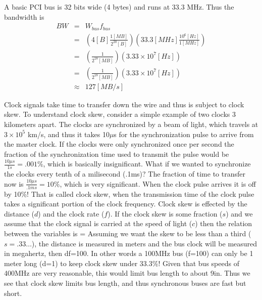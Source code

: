 \begin{example}[PCI]
A basic PCI bus is 32 bits wide (4 bytes) and runs at 33.3 MHz.  Thus the bandwidth is
\begin{eqnarray}
BW 
&=& W_{bus}f_{bus} \\
&=& \left(4 [B]\frac{1 [MB]}{2^{20} [B]}\right)\left(33.3 [MHz]\frac{10^6 [Hz]}{1 [MHz]}\right) \\
&=& \left(\frac{1}{2^{18} [MB]}\right)\left(3.33\times 10^7 [Hz]\right) \\
&=& \left(\frac{1}{2^{18} [MB]}\right)\left(3.33\times 10^7 [Hz]\right) \\
&\approx & 127 [MB/s]
\end{eqnarray}
\end{example}



Clock signals take time to transfer down the wire and thus is subject to clock skew.  To understand clock skew, consider a simple example of two clocks 3 kilometers apart.  The clocks are synchronized by a beam of light, which travels at $3\times 10^5$ km/s, and thus it takes 10$\mu$s for the synchronization pulse to arrive from the master clock.  If the clocks were only synchronized once per second the fraction of the synchronization time used to transmit the pulse would be $\frac{10\mu s}{1s}=.001\%$, which is basically insignificant. What if we wanted to synchronize the clocks every tenth of a milisecond (.1ms)? The fraction of time to transfer now is $\frac{10\mu s}{.1ms}=10\%$, which is very significant.  When the clock pulse arrives it is off by 10\%!  That is called clock skew, when the transmission time of the clock pulse takes a significant portion of the clock frequency.  Clock skew is effected by the distance ($d$) and the clock rate ($f$).  If the clock skew is some fraction ($s$) and we assume that the clock signal is carried at the speed of light ($c$) then the relation between the variables is
\beqn
{} = 
\eeqn
Assuming we want the skew to be less than a third ($s=.33\ldots$), the distance is measured in meters and the bus clock will be measured in megahertz, then
\beqn
df=100.
\eeqn
In other words a 100MHz bus (f=100) can only be 1 meter long (d=1) to keep clock skew under 33.3\%!  Given that bus speeds of 400MHz are very reasonable, this would limit bus length to about 9in.  Thus we see that clock skew limits bus length, and thus synchronous buses are fast but short.

